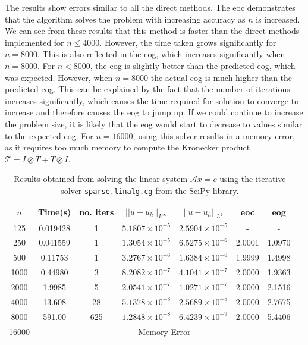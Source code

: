 \documentclass[11pt]{article}
\numberwithin{equation}{section}
\begin{document}
The results show errors similar to all the direct methods. The eoc demonstrates that the algorithm solves the problem with increasing accuracy as $n$ is increased. We can see from these results that this method is faster than the direct methods implemented for $n \leq 4000$. However, the time taken grows significantly for $n=8000$. This is also reflected in the eog, which increases significantly when $n=8000$. For $n<8000$, the eog is slightly better than the predicted eog, which was expected. However, when $n=8000$ the actual eog is much higher than the predicted eog. This can be explained by the fact that the number of iterations increases significantly, which causes the time required for solution to converge to increase and therefore causes the eog to jump up. If we could continue to increase the problem size, it is likely that the eog would start to decrease to values similar to the expected eog.
For $n=16000$, using this solver results in a memory error, as it requires too much memory to compute the Kronecker product $\mathcal{T} = I \otimes T + T \otimes I$.

\begin{table}[H]
\centering
\begin{tabular}{|c|c|c|c|c|c|c|}
\hline
$n$ & Time(s) & no. iters & $|| u - u_h ||_{L^{\infty}}$ &$|| u - u_h ||_{L^{2}}$ & eoc & eog \\
\hline
125 & 0.019428 & 1 & $5.1807 \times 10^{-5}$ & $2.5904 \times 10^{-5}$ & - & - \\
250 & 0.041559 & 1 & $1.3054 \times 10^{-5}$ & $6.5275 \times 10^{-6}$ & 2.0001 & 1.0970 \\
500 & 0.11753 & 1 & $3.2767 \times 10^{-6}$ & $1.6384 \times 10^{-6}$ & 1.9999 & 1.4998 \\
1000 & 0.44980 & 3 & $8.2082 \times 10^{-7}$ & $4.1041 \times 10^{-7}$ & 2.0000 & 1.9363 \\
2000 & 1.9985 & 5 & $2.0541 \times 10^{-7}$ & $1.0271 \times 10^{-7}$ & 2.0000 & 2.1516 \\
4000 & 13.608 & 28 & $5.1378 \times 10^{-8}$ & $2.5689 \times 10^{-8}$ & 2.0000 & 2.7675 \\
8000 & 591.00 & 625 & $1.2848 \times 10^{-8}$ & $6.4239 \times 10^{-9}$ & 2.0000 & 5.4406 \\
\cline{2-7}
16000 & \multicolumn{6}{c|}{Memory Error} \\
\hline
\end{tabular}
\captionsetup{justification=centering}
\caption{Results obtained from solving the linear system $\mathcal{A} x = c$ using the iterative solver  \texttt{sparse.linalg.cg} from the SciPy library.}
\label{table:kron it}
\end{table}
\end{document}
